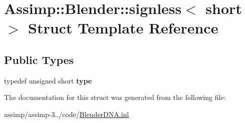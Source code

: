 \hypertarget{struct_assimp_1_1_blender_1_1signless_3_01short_01_4}{\section{Assimp\+:\+:Blender\+:\+:signless$<$ short $>$ Struct Template Reference}
\label{struct_assimp_1_1_blender_1_1signless_3_01short_01_4}
}
\subsection*{Public Types}
\begin{DoxyCompactItemize}
\item 
\hypertarget{struct_assimp_1_1_blender_1_1signless_3_01short_01_4_a24abeb6c2509f39cd1c82faae973b9c5}{typedef unsigned short {\bfseries type}}\label{struct_assimp_1_1_blender_1_1signless_3_01short_01_4_a24abeb6c2509f39cd1c82faae973b9c5}

\end{DoxyCompactItemize}


The documentation for this struct was generated from the following file\+:\begin{DoxyCompactItemize}
\item 
assimp/assimp-\/3../code/\hyperlink{_blender_d_n_a_8inl}{Blender\+D\+N\+A.\+inl}\end{DoxyCompactItemize}
